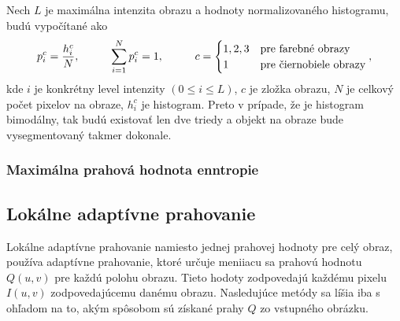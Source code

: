 \documentclass[a4paper,11pt,twoside]{article}%
\begin{document}
Nech $L$ je maximálna intenzita obrazu a hodnoty normalizovaného histogramu, budú vypočítané ako
\begin{equation*}
p_i^c = \frac{h_i^c}{N}, \hspace{10mm}  \sum_{i=1}^{N} p_i^c = 1, \hspace{10mm} c = \begin{cases} 1, 2, 3 & \text{pre farebné obrazy} \\ 1 & \text{pre čiernobiele obrazy} \end{cases},
\end{equation*}
kde $i$ je konkrétny level intenzity $(0 \leq i \leq L)$, $c$ je zložka obrazu, $N$ je celkový počet pixelov na obraze, $h_i^c$ je histogram. Preto v prípade, že je histogram bimodálny, tak budú existovať len dve triedy a objekt na obraze bude vysegmentovaný takmer dokonale.



\subsubsection{Maximálna prahová hodnota enntropie}

\subsection{Lokálne adaptívne prahovanie}

Lokálne adaptívne prahovanie namiesto jednej prahovej hodnoty pre celý obraz, používa adaptívne prahovanie, ktoré určuje meniiacu sa prahovú hodnotu $Q(u,v)$ pre každú polohu obrazu. Tieto hodoty zodpovedajú každému pixelu $I(u,v)$ zodpovedajúcemu danému obrazu. Nasledujúce metódy sa líšia iba s ohľadom na to, akým spôsobom sú získané prahy $Q$ zo vstupného obrázku. 
\end{document}
